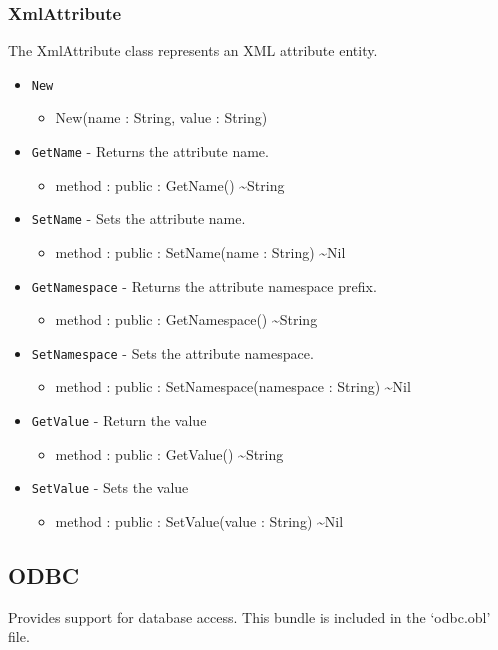 \documentclass[11pt]{article}
\begin{document}
\subsubsection{XmlAttribute}
The XmlAttribute class represents an XML attribute entity.
\begin{itemize}
\item \texttt{New}
  \begin{itemize}
  \item New(name : String, value : String)
  \end{itemize}
\item \texttt{GetName} - Returns the attribute name.
  \begin{itemize}
  \item method : public : GetName() \textasciitilde String
  \end{itemize}
\item \texttt{SetName} - Sets the attribute name.
  \begin{itemize}
  \item method : public : SetName(name : String) \textasciitilde Nil
  \end{itemize}
\item \texttt{GetNamespace} - Returns the attribute namespace prefix.
  \begin{itemize}
  \item method : public : GetNamespace() \textasciitilde String
  \end{itemize}
\item \texttt{SetNamespace} - Sets the attribute namespace.
  \begin{itemize}
  \item method : public : SetNamespace(namespace : String) \textasciitilde Nil
  \end{itemize}
\item \texttt{GetValue} - Return the value
  \begin{itemize}
  \item method : public : GetValue() \textasciitilde String
  \end{itemize}
\item \texttt{SetValue} - Sets the value
  \begin{itemize}
  \item method : public : SetValue(value : String) \textasciitilde Nil
  \end{itemize}
\end{itemize}

\subsection{ODBC}
Provides support for database access.  This bundle is included in the `odbc.obl' file.
\end{document}
